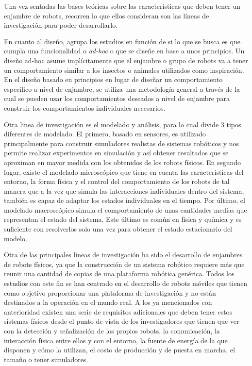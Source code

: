Una vez sentadas las bases teóricas sobre las características que deben tener un enjambre de robots, \citeauthor{christian2008swarm} recorren lo que ellos consideran son las líneas de investigación para poder desarrollarlo. 

En cuanto al diseño, agrupa los estudios en función de si lo que se busca es que cumpla una funcionalidad o \textit{ad-hoc} o que se diseñe en base a unos principios. Un diseño ad-hoc asume implícitamente que el enjambre o grupo de robots va a tener un comportamiento similar a los insectos o animales utilizados como inspiración. En el diseño basado en principios en lugar de diseñar un comportamiento específico a nivel de enjambre, se utiliza una metodología general a través de la cual se pueden usar los comportamientos deseados a nivel de enjambre para construir los comportamientos individuales necesarios.

Otra linea de investigación es el modelado y análisis, para lo cual divide 3 tipos diferentes de modelado. El primero, basado en sensores, es utilizado principalmente para construir simuladores realistas de sistemas robóticos y nos permite realizar experimentos en simulación y así obtener resultados que se aproximan en mayor medida con los obtenidos de los robots físicos. En segundo lugar, existe el modelado microscópico que tiene en cuenta las características del entorno, la forma física y el control del comportamiento de los robots de tal manera que a la vez que simula las interacciones individuales dentro del sistema, también es capaz de adaptar los estados individuales en el tiempo. Por último, el modelado macroscópico simula el comportamiento de unas cantidades medias que representan el estado del sistema. Este último es común en física y química y es suficiente con resolverlos solo una vez para obtener el estado estacionario del modelo.

Otra de las principales líneas de investigación ha sido el desarrollo de enjambres de robots físicos, ya que la construcción de un sistema robótico requiere más que reunir una cantidad de copias de una plataforma robótica genérica. Todos los estudios con este fin se han centrado en el desarrollo de robots móviles que tienen como objetivo proporcionar una plataforma de investigación y no están destinados a la operación en el mundo real. A los ya mencionados con anterioridad existen una serie de requisitos adicionales que deben tener estos sistemas físicos desde el punto de vista de los investigadores que tienen que ver con la detección y señalización de los propios robots, la comunicación, la interacción física entre ellos y con el entorno, la fuente de energía de la que disponen y cómo la utilizan, el costo de producción y de puesta en marcha, el tamaño o tener simuladores.

